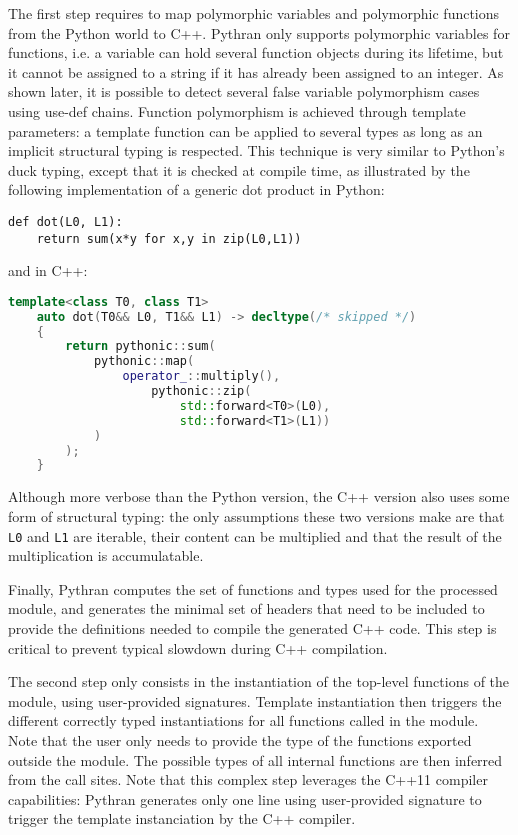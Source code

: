 \documentclass[10pt, onecolumn, preprint]{sigplanconf}
\begin{document}
The first step requires to map polymorphic variables and polymorphic functions
from the Python world to C++. Pythran only supports polymorphic variables for
functions, i.e. a variable can hold several function objects during its lifetime, 
but it cannot be assigned to a string if it has already been assigned to
an integer.  As shown later, it is possible to detect several false variable
polymorphism cases using use-def chains. Function polymorphism is achieved
through template parameters: a template function can be applied to several
types as long as an implicit structural typing is respected. This technique is
very similar to Python's duck typing, except that it is checked at compile
time, as illustrated by the following implementation of a generic dot product
in Python:

\begin{lstlisting}
def dot(L0, L1):
    return sum(x*y for x,y in zip(L0,L1))
\end{lstlisting}

\noindent and in C++:

\begin{lstlisting}[language=c++]
template<class T0, class T1>
    auto dot(T0&& L0, T1&& L1) -> decltype(/* skipped */)
    {
        return pythonic::sum(
            pythonic::map(
                operator_::multiply(),
                    pythonic::zip(
                        std::forward<T0>(L0),
                        std::forward<T1>(L1))
            )
        );
    }
\end{lstlisting}

Although more verbose than the Python version, the C++ version also uses some
form of structural typing: the only assumptions these two versions make are
that \texttt{L0} and \texttt{L1} are iterable, their content can be multiplied
and that the result of the multiplication is accumulatable.

Finally, Pythran computes the set of functions and types used for the processed
module, and generates the minimal set of headers that need to be included to
provide the definitions needed to compile the generated C++ code. This step is
critical to prevent typical slowdown during C++ compilation.

The second step only consists in the instantiation of the top-level functions of
the module, using user-provided signatures. Template instantiation then triggers
the different correctly typed instantiations for all functions called in the
module. Note that the user only needs to provide the type of the functions
exported outside the module. The possible types of all internal functions are
then inferred from the call sites. Note that this complex step leverages the 
C++11 compiler capabilities: Pythran generates only one line using user-provided
signature to trigger the template instanciation by the C++ compiler.
\end{document}
